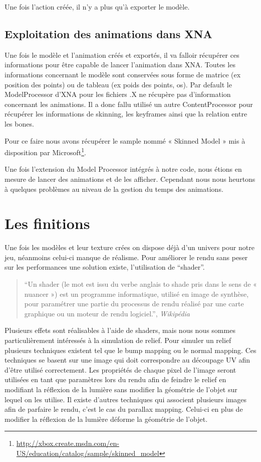 \documentclass[11pt]{report}
\begin{document}
Une fois l’action créée, il n’y a plus qu’à exporter le modèle.

\subsection{Exploitation des animations dans XNA}

Une fois le modèle et l’animation créés et exportés, il va falloir récupérer ces informations pour être capable de lancer l’animation dans XNA. Toutes les informations concernant le modèle sont conservées sous forme de matrice (ex position des points) ou de tableau (ex poids des points, os). 
Par default le ModelProcessor d’XNA pour les fichiers .X ne récupère pas d’information concernant les animations. Il a donc fallu utilisé un autre ContentProcessor pour récupérer les informations de skinning, les  keyframes ainsi que la relation entre les bones.

Pour ce faire nous avons récupérer le sample nommé « Skinned Model » mis à disposition par Microsoft\footnote{\url{http://xbox.create.msdn.com/en-US/education/catalog/sample/skinned_model}}.

Une fois l’extension du Model Processor intégrés à notre code, nous étions en mesure de lancer des animations et de les afficher. Cependant nous nous heurtons à quelques problèmes au niveau de la gestion du temps des animations.

\section{Les finitions}

Une fois les modèles et leur texture crées on dispose déjà d’un univers pour notre jeu, néanmoins celui-ci manque de réalisme. Pour améliorer le rendu sans peser sur les performances une solution existe, l’utilisation de ``shader''.

\begin{quote}
``Un shader (le mot est issu du verbe anglais to shade pris dans le sens de « nuancer ») est un programme informatique, utilisé en image de synthèse, pour paramétrer une partie du processus de rendu réalisé par une carte graphique ou un moteur de rendu logiciel.'', \emph{Wikipédia}
\end{quote}

Plusieurs effets sont réalisables à l’aide de shaders, mais nous nous sommes particulièrement intéressés à la simulation de relief. Pour simuler un relief plusieurs techniques existent tel que le bump mapping ou le normal mapping. Ces techniques se basent sur une image qui doit correspondre au découpage UV afin d’être utilisé correctement. Les propriétés de chaque pixel de l’image seront utilisées en tant que paramètres lors du rendu afin de feindre le relief en modifiant la réflexion de la lumière sans modifier la géométrie de l’objet sur lequel on les utilise. Il existe d’autres techniques qui associent plusieurs images afin de parfaire le rendu, c’est le cas du parallax mapping. Celui-ci en plus de modifier la réflexion de la lumière déforme la géométrie de l’objet.
\end{document}
